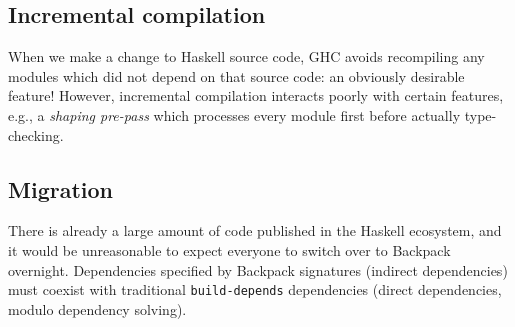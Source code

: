 \subsection{Incremental compilation}

When we make a change to Haskell source code, GHC avoids recompiling
any modules which did not depend on that source code: an obviously
desirable feature!  However, incremental compilation interacts
poorly with certain features, e.g., a \emph{shaping pre-pass} which
processes every module first before actually type-checking.


\subsection{Migration}

There is already a large amount of code published in the Haskell
ecosystem, and it would be unreasonable to expect everyone to switch
over to Backpack overnight.  Dependencies specified by Backpack
signatures (indirect dependencies) must coexist with traditional
\verb|build-depends| dependencies (direct dependencies, modulo
dependency solving).
